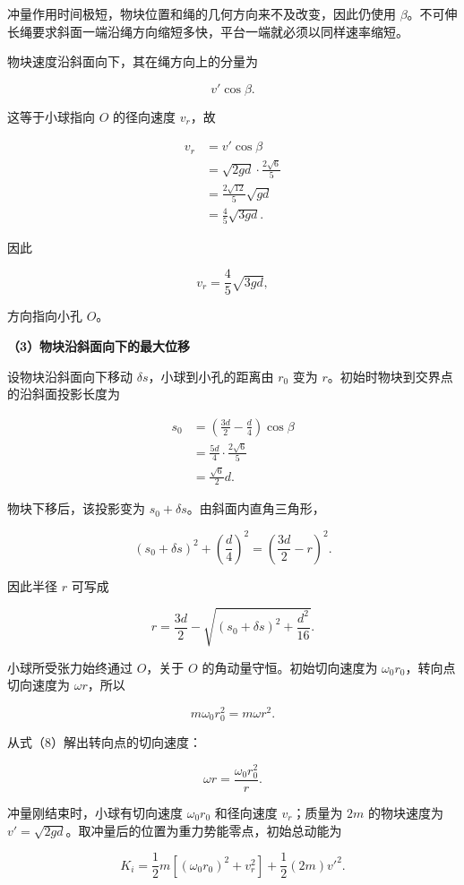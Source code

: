 \documentclass[12pt,a4paper,UTF8]{ctexart}
\begin{document}
冲量作用时间极短，物块位置和绳的几何方向来不及改变，因此仍使用
\(\beta\)。不可伸长绳要求斜面一端沿绳方向缩短多快，平台一端就必须以同样速率缩短。

物块速度沿斜面向下，其在绳方向上的分量为

\[
v'\cos\beta.
\]

这等于小球指向 \(O\) 的径向速度 \(v_r\)，故

\[
\begin{aligned}
v_r
&=v'\cos\beta\\
&=\sqrt{2gd}\cdot\frac{2\sqrt6}{5}\\
&=\frac{2\sqrt{12}}5\sqrt{gd}\\
&=\frac45\sqrt{3gd}.
\end{aligned}
\]

因此

\[
\boxed{v_r=\frac45\sqrt{3gd}},
\]

方向指向小孔 \(O\)。

\textbf{（3）物块沿斜面向下的最大位移}

设物块沿斜面向下移动 \(\delta s\)，小球到小孔的距离由 \(r_0\) 变为
\(r\)。初始时物块到交界点的沿斜面投影长度为

\[
\begin{aligned}
s_0
&=\left(\frac{3d}{2}-\frac d4\right)\cos\beta\\
&=\frac{5d}{4}\cdot\frac{2\sqrt6}{5}\\
&=\frac{\sqrt6}{2}d.
\end{aligned}
\tag{5}
\]

物块下移后，该投影变为 \(s_0+\delta s\)。由斜面内直角三角形，

\[
(s_0+\delta s)^2+\left(\frac d4\right)^2
=\left(\frac{3d}{2}-r\right)^2.
\tag{6}
\]

因此半径 \(r\) 可写成

\[
r=\frac{3d}{2}
-\sqrt{(s_0+\delta s)^2+\frac{d^2}{16}}.
\tag{7}
\]

小球所受张力始终通过 \(O\)，关于 \(O\) 的角动量守恒。初始切向速度为
\(\omega_0r_0\)，转向点切向速度为 \(\omega r\)，所以

\[
m\omega_0r_0^2=m\omega r^2.
\tag{8}
\]

从式（8）解出转向点的切向速度：

\[
\omega r=\frac{\omega_0r_0^2}{r}.
\tag{9}
\]

冲量刚结束时，小球有切向速度 \(\omega_0r_0\) 和径向速度 \(v_r\)；质量为
\(2m\) 的物块速度为
\(v'=\sqrt{2gd}\)。取冲量后的位置为重力势能零点，初始总动能为

\[
K_i
=\frac12m\left[(\omega_0r_0)^2+v_r^2\right]
+\frac12(2m)v'^2.
\tag{10}
\]
\end{document}
